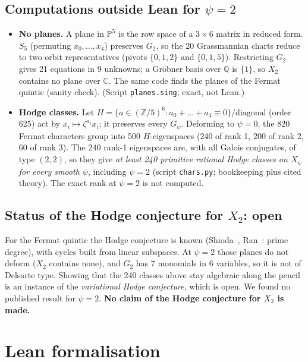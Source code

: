 \documentclass[11pt]{article}
\theoremstyle{definition}\newtheorem{definition}[theorem]{Definition}\newtheorem{remark}[theorem]{Remark}
\newcommand{\PP}{\mathbb{P}}\newcommand{\CC}{\mathbb{C}}\newcommand{\QQ}{\mathbb{Q}}
\begin{document}
\subsection{Computations outside Lean for $\psi=2$}
\begin{itemize}
\item \textbf{No planes.} A plane in $\PP^5$ is the row space of a $3\times6$ matrix in reduced form.
$S_5$ (permuting $x_0,\dots,x_4$) preserves $G_2$, so the 20 Grassmannian charts reduce to two orbit
representatives (pivots $\{0,1,2\}$ and $\{0,1,5\}$). Restricting $G_2$ gives 21 equations in 9
unknowns; a Gr\"obner basis over $\QQ$ is $\{1\}$, so $X_2$ contains no plane over $\CC$. The same code
finds the planes of the Fermat quintic (sanity check). (Script \texttt{planes.sing}; exact, not Lean.)
\item \textbf{Hodge classes.} Let $H=\{a\in(\mathbb Z/5)^6: a_0+\dots+a_4\equiv0\}/\text{diagonal}$ (order 625)
act by $x_i\mapsto\zeta^{a_i}x_i$; it preserves every $G_\psi$. Deforming to $\psi=0$, the 820 Fermat
characters group into 500 $H$-eigenspaces (240 of rank 1, 200 of rank 2, 60 of rank 3). The 240 rank-1
eigenspaces are, with all Galois conjugates, of type $(2,2)$, so they give \emph{at least 240 primitive
rational Hodge classes on $X_\psi$ for every smooth $\psi$}, including $\psi=2$ (script \texttt{chars.py};
bookkeeping plus cited theory). The exact rank at $\psi=2$ is not computed.
\end{itemize}

\subsection{Status of the Hodge conjecture for $X_2$: open}
For the Fermat quintic the Hodge conjecture is known (Shioda~\cite{Shioda79}, Ran~\cite{Ran80}: prime degree),
with cycles built from linear subspaces. At $\psi=2$ those planes do not deform ($X_2$ contains none), and
$G_2$ has 7 monomials in 6 variables, so it is not of Delsarte type. Showing that the 240 classes above stay
algebraic along the pencil is an instance of the \emph{variational Hodge conjecture}, which is open. We found no
published result for $\psi=2$. \textbf{No claim of the Hodge conjecture for $X_2$ is made.}
\section{Lean formalisation}\label{sec:lean}
\end{document}
